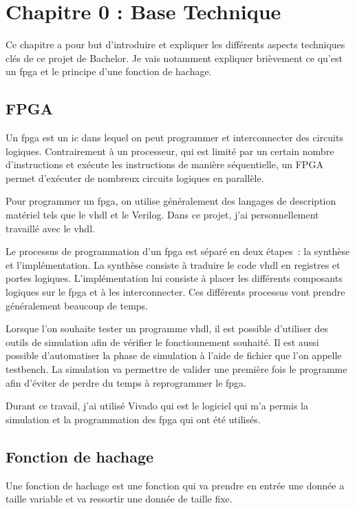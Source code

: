 \chapter{Chapitre 0 : Base Technique}

Ce chapitre a pour but d'introduire et expliquer les différents aspects techniques clés de ce projet de Bachelor. Je vais notamment expliquer brièvement ce qu'est un \gls{fpga} et le principe d'une fonction de hachage.

\section{FPGA}
Un \gls{fpga} est un \gls{ic} dans lequel on peut programmer et interconnecter des circuits logiques. Contrairement à un processeur, qui est limité par un certain nombre d'instructions et exécute les instructions de manière séquentielle, un FPGA permet d'exécuter de nombreux circuits logiques en parallèle.

Pour programmer un \gls{fpga}, on utilise généralement des langages de description matériel tels que le \gls{vhdl} et le Verilog. Dans ce projet, j'ai personnellement travaillé avec le \gls{vhdl}.

Le processus de programmation d'un \gls{fpga} est séparé en deux étapes : la synthèse et l'implémentation. 
La synthèse consiste à traduire le code \gls{vhdl} en registres et portes logiques. 
L'implémentation lui consiste à placer les différents composants logiques sur le \gls{fpga} et à les interconnecter.
Ces différents processus vont prendre généralement beaucoup de temps.

Lorsque l'on souhaite tester un programme \gls{vhdl}, il est possible d'utiliser des outils de simulation afin de vérifier le fonctionnement souhaité. Il est aussi possible d'automatiser la phase de simulation à l'aide de fichier que l'on appelle testbench.
La simulation va permettre de valider une première fois le programme afin d'éviter de perdre du temps à reprogrammer le \gls{fpga}.

Durant ce travail, j'ai utilisé Vivado qui est le logiciel qui m'a permis la simulation et la programmation des \gls{fpga} qui ont été utilisés. 



\section{Fonction de hachage}

Une fonction de hachage est une fonction qui va prendre en entrée une donnée a taille variable et va ressortir une donnée de taille fixe. 

